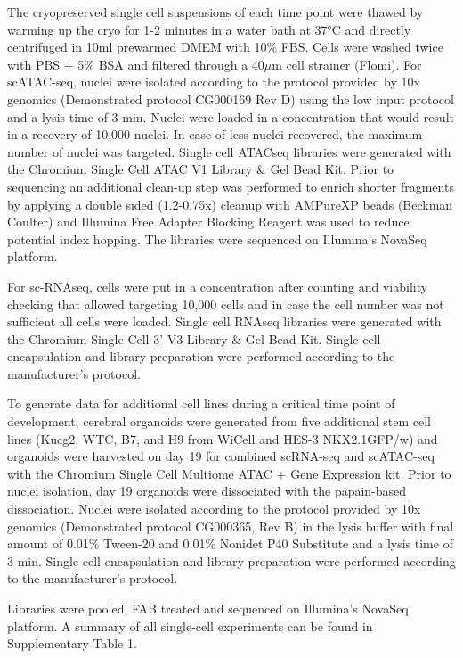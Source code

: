 The cryopreserved single cell suspensions of each time point were thawed by warming up the cryo for 1-2 minutes in a water bath at 37°C and directly centrifuged in 10ml prewarmed DMEM with 10\% FBS. Cells were washed twice with PBS + 5\% BSA and filtered through a 40$\mu$m cell strainer (Flomi). For scATAC-seq, nuclei were isolated according to the protocol provided by 10x genomics (Demonstrated protocol CG000169 Rev D) using the low input protocol and a lysis time of 3 min. Nuclei were loaded in a concentration that would result in a recovery of 10,000 nuclei. In case of less nuclei recovered, the maximum number of nuclei was targeted. Single cell ATACseq libraries were generated with the Chromium Single Cell ATAC V1 Library \& Gel Bead Kit. Prior to sequencing an additional clean-up step was performed to enrich shorter fragments by applying a double sided (1.2-0.75x) cleanup with AMPureXP beads (Beckman Coulter) and Illumina Free Adapter Blocking Reagent was used to reduce potential index hopping. The libraries were sequenced on Illumina’s NovaSeq platform.

For sc-RNAseq, cells were put in a concentration after counting and viability checking that allowed targeting 10,000 cells and in case the cell number was not sufficient all cells were loaded. Single cell RNAseq libraries were generated with the Chromium Single Cell 3’ V3 Library \& Gel Bead Kit. Single cell encapsulation and library preparation were performed according to the manufacturer's protocol.

To generate data for additional cell lines during a critical time point of development, cerebral organoids were generated from five additional stem cell lines (Kucg2, WTC, B7, and H9 from WiCell and HES-3 NKX2.1GFP/w) and organoids were harvested on day 19 for combined scRNA-seq and scATAC-seq with the Chromium Single Cell Multiome ATAC + Gene Expression kit. Prior to nuclei isolation, day 19 organoids were dissociated with the papain-based dissociation. Nuclei were isolated according to the protocol provided by 10x genomics (Demonstrated protocol CG000365, Rev B) in the lysis buffer with final amount of 0.01\% Tween-20 and 0.01\% Nonidet P40 Substitute and a lysis time of 3 min. Single cell encapsulation and library preparation were performed according to the manufacturer's protocol.

Libraries were pooled, FAB treated and sequenced on Illumina’s NovaSeq platform. A summary of all single-cell experiments can be found in Supplementary Table 1. 
 
